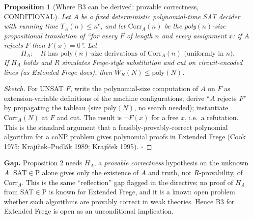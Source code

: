 \documentclass[11pt]{article}
\newtheorem{proposition}[theorem]{Proposition}
\begin{document}
\begin{proposition}[Where B3 can be derived: provable correctness, CONDITIONAL]
Let $A$ be a fixed deterministic polynomial-time SAT decider with running time $T_A(n)\le n^c$, and let $\mathrm{Corr}_A(n)$ be the poly$(n)$-size propositional translation of ``for every $F$ of length $n$ and every assignment $x$: if $A$ rejects $F$ then $F(x)=0$''. Let
\[ H_A:\quad R\text{ has }\mathrm{poly}(n)\text{-size derivations of }\mathrm{Corr}_A(n)\text{ (uniformly in }n).\]
If $H_A$ holds and $R$ simulates Frege-style substitution and cut on circuit-encoded lines (as Extended Frege does), then $\overline W_R(N)\le \mathrm{poly}(N)$.
\end{proposition}
\begin{proof}[Sketch] For UNSAT $F$, write the polynomial-size computation of $A$ on $F$ as extension-variable definitions of the machine configurations; derive ``$A$ rejects $F$'' by propagating the tableau (size $\mathrm{poly}(N)$, no search needed); instantiate $\mathrm{Corr}_A(N)$ at $F$ and cut. The result is $\neg F(x)$ for a free $x$, i.e.\ a refutation. This is the standard argument that a feasibly-provably-correct polynomial algorithm for a coNP problem gives polynomial proofs in Extended Frege (Cook 1975; Krajíček--Pudlák 1989; Krajíček 1995). \qquad$\square$
\end{proof}
\noindent\textbf{Gap.} Proposition 2 needs $H_A$, a \emph{provable correctness} hypothesis on the unknown $A$. SAT$\in$P alone gives only the existence of $A$ and truth, not $R$-provability, of $\mathrm{Corr}_A$. This is the same ``reflection'' gap flagged in the directive; no proof of $H_A$ from SAT$\in$P is known for Extended Frege, and it is a known open problem whether such algorithms are provably correct in weak theories. Hence B3 for Extended Frege is open as an unconditional implication.
\end{document}
